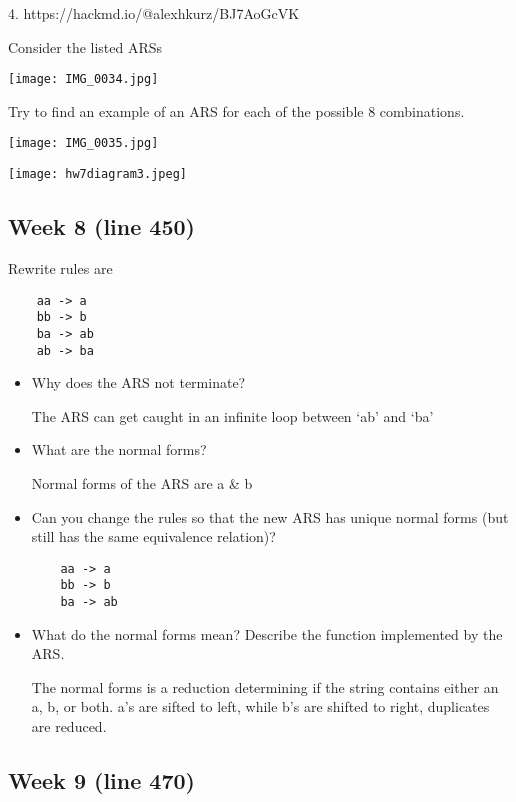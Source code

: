 \documentclass{article}
\theoremstyle{theorem}
\theoremstyle{definition}
\theoremstyle{remark}
\begin{document}
4.  https://hackmd.io/@alexhkurz/BJ7AoGcVK

Consider the listed ARSs

\texttt{[image: IMG\_0034.jpg]}

Try to find an example of an ARS for each of the possible 8 combinations.

\texttt{[image: IMG\_0035.jpg]}

\texttt{[image: hw7diagram3.jpeg]}

\subsection{Week 8 (line 450)}
Rewrite rules are
\begin{verbatim}
    aa -> a
    bb -> b
    ba -> ab
    ab -> ba
\end{verbatim}
\begin{itemize}
\item Why does the ARS not terminate?

The ARS can get caught in an infinite loop between ‘ab’ and ‘ba’

\item What are the normal forms?

Normal forms of the ARS are a & b

\item Can you change the rules so that the new ARS has unique normal forms (but still has the same equivalence relation)?
\begin{verbatim}
    aa -> a
    bb -> b
    ba -> ab
\end{verbatim}
\item What do the normal forms mean? Describe the function implemented by the ARS.

The normal forms is a reduction determining if the string contains either an a, b, or both.
a’s are sifted to left, while b’s are shifted to right, duplicates are reduced.
\end{itemize}

\subsection{Week 9 (line 470)}
\end{document}
